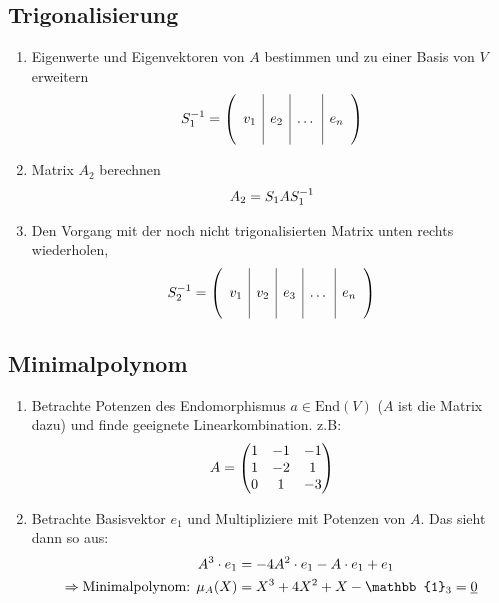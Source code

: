 \documentclass[ngerman,a4paper]{article}
\begin{document}
\subsection{Trigonalisierung}
\begin{enumerate}[label=\textbf{\arabic*.}]
	\item Eigenwerte und Eigenvektoren von $A$ bestimmen und zu einer Basis von $V$ erweitern
	\begin{align}
		S_1^{-1} = \left(\begin{array}{c|c|c|c}
		&&& \\
		v_1 & e_2 & \dots & e_n \\
		&&&
		\end{array}\right)\notag
	\end{align}
	\item Matrix $A_2$ berechnen
	\begin{align}
		A_2 = S_1AS_1^{-1}\notag
	\end{align}
	\item Den Vorgang mit der noch nicht trigonalisierten Matrix unten rechts wiederholen,
	\begin{align}
		S_2^{-1} = \left(\begin{array}{c|c|c|c|c}
		&&&& \\
		v_1 & v_2 & e_3 & \dots & e_n \\
		&&&&
		\end{array}\right)\notag
	\end{align}
\end{enumerate}

\subsection{Minimalpolynom}
\begin{enumerate}[label=\textbf{\arabic*.}]
	\item Betrachte Potenzen des Endomorphismus $a \in \text{End}(V)$ ($A$ ist die Matrix dazu) und finde geeignete Linearkombination. z.B:
	\begin{align}
		A=\begin{pmatrix}
		1 & -1 & -1\\
		1 & -2 & 1\\
		0 & 1 & -3
		\end{pmatrix}\notag
	\end{align}
	\item Betrachte Basisvektor $e_1$ und Multipliziere mit Potenzen von $A$. Das sieht dann so aus:
	\begin{align}
		A^3 \cdot e_1 &= -4A^2\cdot e_1 - A\cdot e_1 + e_1\notag \\
		\Rightarrow \text{Minimalpolynom: } \mu_A (X) &= X^3 + 4X^2+X -\mathbb{1}_3 = \underline{0}\notag
	\end{align}
\end{enumerate}
\end{document}

